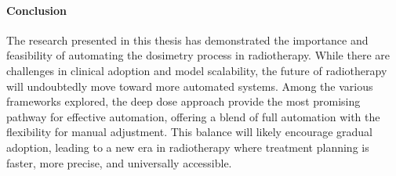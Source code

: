 \paragraph{Conclusion}
The research presented in this thesis has demonstrated the importance and feasibility of automating the dosimetry process in radiotherapy.
While there are challenges in clinical adoption and model scalability, the future of radiotherapy will undoubtedly move toward more automated systems.
Among the various frameworks explored, the deep dose approach provide the most promising pathway for effective automation, offering a blend of full automation with the flexibility for manual adjustment.
This balance will likely encourage gradual adoption, leading to a new era in radiotherapy where treatment planning is faster, more precise, and universally accessible.
